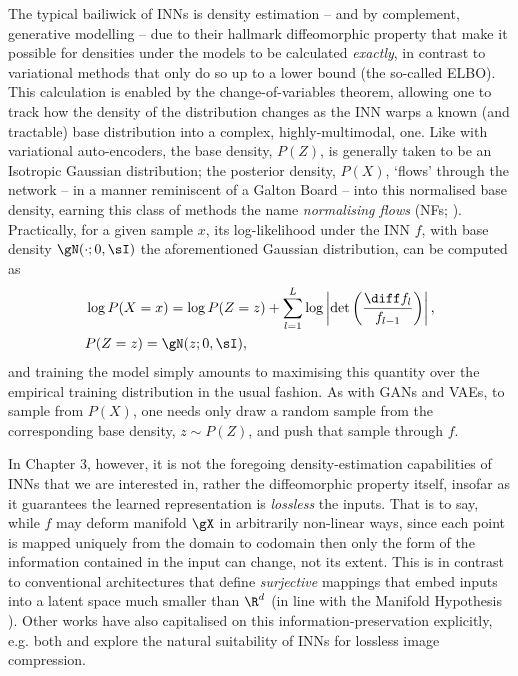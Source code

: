 The typical bailiwick of INNs is density estimation -- and by complement, generative modelling --
due to their hallmark diffeomorphic property that make it possible for densities under the models
to be calculated \emph{exactly}, in contrast to variational methods that only do so up to a lower
bound (the so-called ELBO). 
%
%
This calculation is enabled by the change-of-variables theorem, allowing one to track how the
density of the distribution changes as the INN warps a known (and tractable) base distribution into
a complex, highly-multimodal, one.
%
Like with variational auto-encoders, the base density, \(P(Z)\), is generally taken to be an
Isotropic Gaussian distribution; the posterior density, \(P(X)\), `flows' through the network -- in
a manner reminiscent of a Galton Board -- into this normalised base density, earning this class of
methods the name \emph{normalising flows} (NFs; \cite{rezende2015variational,
kobyzev2020normalizing}).
%
Practically, for a given sample \(x\), its log-likelihood under the INN \(f\), with base density
\(\gN(\cdot; 0, \sI)\) the aforementioned Gaussian distribution, can be computed as
%
\begin{equation*}
    \begin{aligned}
        &\log P(X=x) = 
        \log P(Z=z) + \sum_{l=1}^L \log \left| \det\left( \frac{\diff f_l}{ f_{l-1}}\right)
        \right|, \\
        &P(Z=z) = \gN(z; 0, \sI),
    \end{aligned}
\label{eq:changeofvariables}
\end{equation*}
%
and training the model simply amounts to maximising this quantity over the empirical training
distribution in the usual fashion.
%
As with GANs and VAEs, to sample from \(P(X)\), one needs only draw a random sample from the
corresponding base density, \(z \sim P(Z) \), and push that sample through \(f\).

%
%
In Chapter 3, however, it is not the foregoing density-estimation capabilities of INNs that we are
interested in, rather the diffeomorphic property itself, insofar as it guarantees the learned
representation is \emph{lossless} \wrt{} the inputs.
%
That is to say, while \(f\) may deform manifold \(\gX\) in arbitrarily non-linear ways, since each
point is mapped uniquely from the domain to codomain then only the form of the information
contained in the input can change, not its extent. 
%
This is in contrast to conventional architectures that define \emph{surjective} mappings that embed
inputs into a latent space much smaller than \(\R^d\) (in line with the Manifold Hypothesis
\citep{fefferman2016testing}).
%
Other works have also capitalised on this information-preservation explicitly, e.g. both
\cite{hoogeboom2019integer} and \cite{xie2021enhanced} explore the natural suitability of INNs for
lossless image compression.




